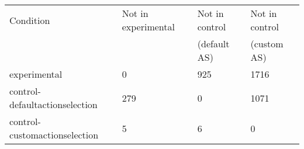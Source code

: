 \begin{center}
\begin{tabular}{|l|l|l|l|}
\hline
Condition & Not in experimental & Not in control & Not in control\\
          &                     & (default AS)   & (custom AS)\\
\hline
experimental & 0 & 925 & 1716 \\
control-defaultactionselection & 279 & 0 & 1071 \\
control-customactionselection & 5 & 6 & 0 \\
\hline
\end{tabular}
\end{center}
